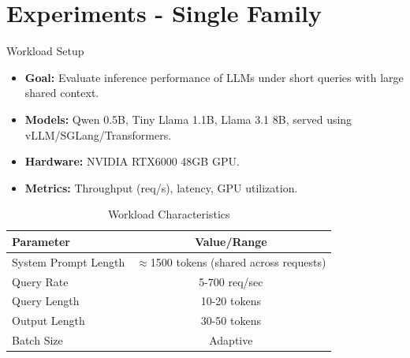 \documentclass[Serif, 10pt, brown]{beamer}
\theoremstyle{example}
\theoremstyle{plain}
\begin{document}
\section{Experiments - Single Family}
\begin{frame}{Workload Setup}
\begin{itemize}
    \item \textbf{Goal:} Evaluate inference performance of LLMs under short queries with large shared context. \pause
    \item \textbf{Models:} Qwen 0.5B, Tiny Llama 1.1B, Llama 3.1 8B, served using vLLM/SGLang/Transformers. \pause
    \item \textbf{Hardware:} NVIDIA RTX6000 48GB GPU. \pause
    \item \textbf{Metrics:} Throughput (req/s), latency, GPU utilization.
\end{itemize}

\begin{table}[h!]
\centering
\scriptsize
\begin{tabular}{|l|c|}
\hline
\textbf{Parameter} & \textbf{Value/Range} \\
\hline
System Prompt Length & $\approx$1500 tokens (shared across requests) \\
Query Rate & 5-700 req/sec \\
Query Length & 10-20 tokens \\
Output Length & 30-50 tokens \\
Batch Size & Adaptive \\
\hline
\end{tabular}
\caption{Workload Characteristics}
\end{table}
\end{frame}
\end{document}
